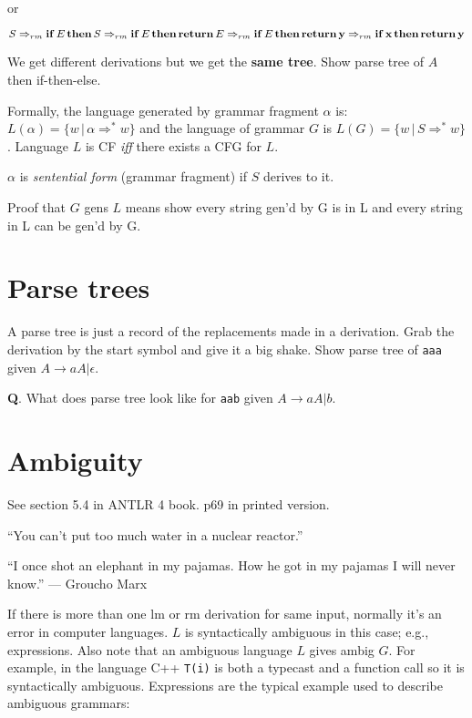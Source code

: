 \documentclass[11pt,twocolumn,nocopyright]{sigplanconf}
\begin{document}
\noindent or

\noindent $S \Rightarrow_{rm} {\bf if}\, E\, {\bf then}\, S \\
\Rightarrow_{rm} {\bf if}\, E\, {\bf then}\, {\bf return}\, E \\
\Rightarrow_{rm} {\bf if}\, E\, {\bf then}\, {\bf return}\, {\bf y}\\
\Rightarrow_{rm} {\bf if}\, {\bf x}\, {\bf then}\, {\bf return}\, {\bf y}$

We get different derivations but we get the {\bf same tree}. Show parse tree of $A$ then if-then-else.

Formally, the language generated by grammar fragment $\alpha$ is: $L(\alpha)=\{ w \, | \, \alpha \Rightarrow^* w\}$ and the language of grammar $G$ is $L(G) = \{ w \, | \, S \Rightarrow^* w\}$. Language $L$ is CF {\em iff} there exists a CFG for $L$.

$\alpha$ is {\em sentential form} (grammar fragment) if $S$ derives to it.

Proof that $G$ gens $L$ means show every string gen'd by G is in L and every string in L can be gen'd by G.

\section{Parse trees}

A parse tree is just a record of the replacements made in a derivation. Grab the derivation by the start symbol and give it a big shake.  Show parse tree of {\tt aaa} given $A \rightarrow a A | \epsilon$.

{\bf Q}. What does parse tree look like for {\tt aab} given $A \rightarrow a A | b$.

\section{Ambiguity}

See section 5.4 in ANTLR 4 book. p69 in printed version.

``You can't put too much water in a nuclear reactor.'' 

``I once shot an elephant in my pajamas. How he got in my pajamas I will never know.'' --- Groucho Marx

If there is more than one lm or rm derivation for same input, normally it's an error in computer languages. $L$ is syntactically ambiguous in this case; e.g., expressions.  Also note that an ambiguous language $L$ gives ambig $G$.  For example, in the language C++ {\tt T(i)} is both a typecast and a function call so it is syntactically ambiguous. Expressions are the typical example used to describe ambiguous grammars:\\
\end{document}
